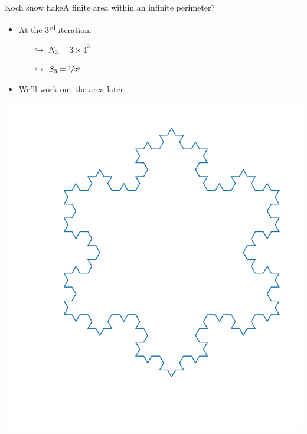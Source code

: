 \documentclass[usenames,dvipsnames,svgnames,10pt,aspectratio=169]{beamer}
\begin{document}
\begin{frame}[t, c]{Koch snow flake}{A finite area within an infinite perimeter?}
	\centering
	\begin{minipage}{.48\textwidth}
		\begin{itemize}
			\item At the 3\textsuperscript{rd} iteration:
			\begin{itemize}
				\item[$\hookrightarrow$] $N_3 = 3 \times 4^3$
				\item[$\hookrightarrow$] $S_3 = \nicefrac{1}{3^3}$
			\end{itemize}

			\bigskip

			\item We'll work out the area later.
		\end{itemize}
	\end{minipage}%
	\hfill
	\begin{minipage}{.48\textwidth}
		\centering
		\includegraphics[width=.8\textwidth]{koch_3_it}
	\end{minipage}

	\vspace{1cm}
\end{frame}
\end{document}
